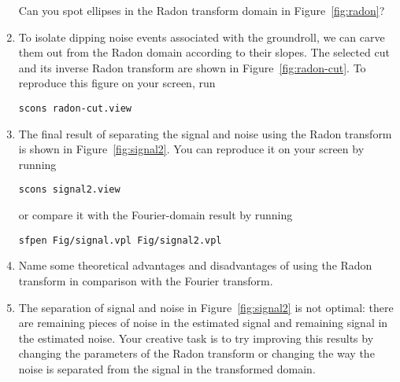 \begin{enumerate}
\answer{}

Can you spot ellipses in the Radon transform domain in Figure~\ref{fig:radon}?


\item To isolate dipping noise events associated with the groundroll, we can carve them out from the Radon domain according to their slopes. The selected cut and its inverse Radon transform are shown in Figure~\ref{fig:radon-cut}. To reproduce this figure on your screen, run
\begin{verbatim}
scons radon-cut.view
\end{verbatim}

\item The final result of separating the signal and noise using the Radon transform is shown in Figure~\ref{fig:signal2}. You can reproduce it on your screen by running
\begin{verbatim}
scons signal2.view
\end{verbatim}
or compare it with the Fourier-domain result by running
\begin{verbatim}
sfpen Fig/signal.vpl Fig/signal2.vpl
\end{verbatim}

\item Name some theoretical advantages and disadvantages of using the Radon transform in comparison with the Fourier transform.

\answer{}

\item The separation of signal and noise in Figure~\ref{fig:signal2} is not optimal: there are remaining pieces of noise in the estimated signal and remaining signal in the estimated noise. Your creative task is to try improving this results by changing the parameters of the Radon transform or changing the way the noise is separated from the signal in the transformed domain.

\end{enumerate}

\lstset{language=python,numbers=left,numberstyle=\tiny,showstringspaces=false}


\lstset{language=c,numbers=left,numberstyle=\tiny,showstringspaces=false}


